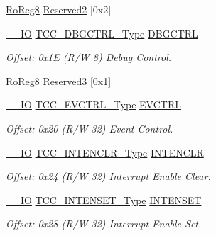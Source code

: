 \begin{DoxyCompactItemize}
\mbox{\hyperlink{group___s_a_m_d21_e15_a__definitions_ga0d957f1433aaf5d70e4dc2b68288442d}{Ro\+Reg8}} \mbox{\hyperlink{struct_tcc_a2e22156efdbee765577c760f170204da}{Reserved2}} \mbox{[}0x2\mbox{]}
\item 
\mbox{\hyperlink{core__cm0plus_8h_aec43007d9998a0a0e01faede4133d6be}{\+\_\+\+\_\+\+IO}} \mbox{\hyperlink{union_t_c_c___d_b_g_c_t_r_l___type}{T\+C\+C\+\_\+\+D\+B\+G\+C\+T\+R\+L\+\_\+\+Type}} \mbox{\hyperlink{struct_tcc_a721809f2f5c39fde4b2a969ed30b1bf8}{D\+B\+G\+C\+T\+RL}}
\begin{DoxyCompactList}\small\item\em Offset\+: 0x1E (R/W 8) Debug Control. \end{DoxyCompactList}\item 
\mbox{\hyperlink{group___s_a_m_d21_e15_a__definitions_ga0d957f1433aaf5d70e4dc2b68288442d}{Ro\+Reg8}} \mbox{\hyperlink{struct_tcc_a04871068e4c9aaff01e365b7b670bde9}{Reserved3}} \mbox{[}0x1\mbox{]}
\item 
\mbox{\hyperlink{core__cm0plus_8h_aec43007d9998a0a0e01faede4133d6be}{\+\_\+\+\_\+\+IO}} \mbox{\hyperlink{union_t_c_c___e_v_c_t_r_l___type}{T\+C\+C\+\_\+\+E\+V\+C\+T\+R\+L\+\_\+\+Type}} \mbox{\hyperlink{struct_tcc_a5840e5fa650180136e44fe3a96c6dbec}{E\+V\+C\+T\+RL}}
\begin{DoxyCompactList}\small\item\em Offset\+: 0x20 (R/W 32) Event Control. \end{DoxyCompactList}\item 
\mbox{\hyperlink{core__cm0plus_8h_aec43007d9998a0a0e01faede4133d6be}{\+\_\+\+\_\+\+IO}} \mbox{\hyperlink{union_t_c_c___i_n_t_e_n_c_l_r___type}{T\+C\+C\+\_\+\+I\+N\+T\+E\+N\+C\+L\+R\+\_\+\+Type}} \mbox{\hyperlink{struct_tcc_a444b5d7ae83cf9c73ece383f39c4c7ba}{I\+N\+T\+E\+N\+C\+LR}}
\begin{DoxyCompactList}\small\item\em Offset\+: 0x24 (R/W 32) Interrupt Enable Clear. \end{DoxyCompactList}\item 
\mbox{\hyperlink{core__cm0plus_8h_aec43007d9998a0a0e01faede4133d6be}{\+\_\+\+\_\+\+IO}} \mbox{\hyperlink{union_t_c_c___i_n_t_e_n_s_e_t___type}{T\+C\+C\+\_\+\+I\+N\+T\+E\+N\+S\+E\+T\+\_\+\+Type}} \mbox{\hyperlink{struct_tcc_a22a208b86a37c61d35daf19fe8a3e8d8}{I\+N\+T\+E\+N\+S\+ET}}
\begin{DoxyCompactList}\small\item\em Offset\+: 0x28 (R/W 32) Interrupt Enable Set. \end{DoxyCompactList}\item 

\end{DoxyCompactItemize}
